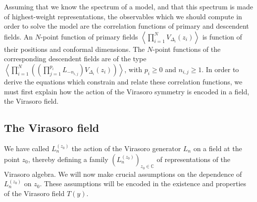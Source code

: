 \documentclass[12pt,a4paper,notitlepage]{report}
\newcommand \la {\left\langle}
\newcommand \ra {\right\rangle}
\newcommand \C {\mathbb{C}}
\numberwithin{equation}{section}
\theoremstyle{break}
\begin{document}
Assuming that we know the spectrum of a model, and that this spectrum is made of highest-weight representations, the observables which we should compute in order to solve the model are the correlation functions of primary and descendent fields. An $N$-point function of primary fields $\la \prod_{i=1}^N V_{\Delta_i}(z_i) \ra$ is function of their positions and conformal dimensions. The $N$-point functions of the corresponding descendent fields are of the type $\la \prod_{i=1}^N \left(\left(\prod_{j=1}^{p_i} L_{-n_{i,j}}\right)V_{\Delta_i}(z_i)\right) \ra$, with $p_i\geq 0$ and $n_{i,j}\geq 1$. 
In order to derive the equations which constrain and relate these correlation functions, we must first explain how the action of the Virasoro symmetry is encoded in a field, the Virasoro field.


\subsection{The Virasoro field \label{sectvf}}

We have called $L_n^{(z_0)}$ the action of the Virasoro generator $L_n$ on a field at the point $z_0$, thereby defining a family $(L_n^{(z_0)})_{z_0\in\C}$ of representations of the Virasoro algebra. We will now make crucial assumptions on the dependence of $L_n^{(z_0)}$ on $z_0$. These assumptions will be encoded in the existence and properties of the Virasoro field $T(y)$.
\end{document}
